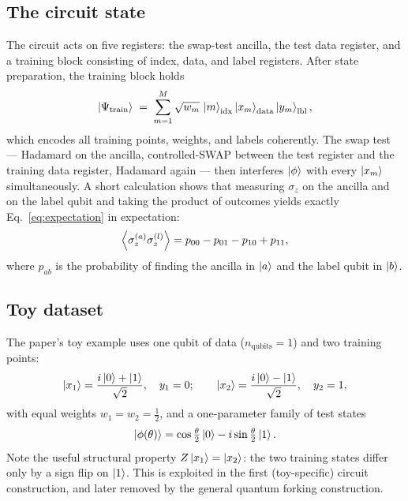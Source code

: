 \documentclass[11pt,a4paper]{article}
\begin{document}
\subsection{The circuit state}

The circuit acts on five registers: the swap-test ancilla, the test data
register, and a training block consisting of index, data, and label
registers. After state preparation, the training block holds
\begin{equation}
  \label{eq:training-state}
  \ket{\Psi_{\text{train}}}
  \;=\; \sum_{m=1}^{M} \sqrt{w_m}\, \ket{m}_{\text{idx}}
        \ket{x_m}_{\text{data}} \ket{y_m}_{\text{lbl}},
\end{equation}
which encodes all training points, weights, and labels coherently. The swap
test --- Hadamard on the ancilla, controlled-SWAP between the test register
and the training data register, Hadamard again --- then interferes
$\ket{\phi}$ with every $\ket{x_m}$ simultaneously. A short calculation
shows that measuring $\sigma_z$ on the ancilla and on the label qubit and
taking the product of outcomes yields exactly
Eq.~\eqref{eq:expectation} in expectation:
\begin{equation}
  \expval{\sigma_z^{(a)} \sigma_z^{(l)}}
  = p_{00} - p_{01} - p_{10} + p_{11},
\end{equation}
where $p_{ab}$ is the probability of finding the ancilla in $\ket{a}$ and
the label qubit in $\ket{b}$.

\subsection{Toy dataset}

The paper's toy example uses one qubit of data ($n_{\text{qubits}} = 1$) and
two training points:
\begin{equation}
  \ket{x_1} = \frac{i\ket{0} + \ket{1}}{\sqrt{2}}, \quad y_1 = 0;
  \qquad
  \ket{x_2} = \frac{i\ket{0} - \ket{1}}{\sqrt{2}}, \quad y_2 = 1,
\end{equation}
with equal weights $w_1 = w_2 = \tfrac12$, and a one-parameter family of
test states
\begin{equation}
  \ket{\phi(\theta)} = \cos\tfrac{\theta}{2}\ket{0}
                     - i \sin\tfrac{\theta}{2}\ket{1}.
\end{equation}
Note the useful structural property $Z\ket{x_1} = \ket{x_2}$: the two
training states differ only by a sign flip on $\ket{1}$. This is exploited
in the first (toy-specific) circuit construction, and later removed by the
general quantum forking construction.
\end{document}
